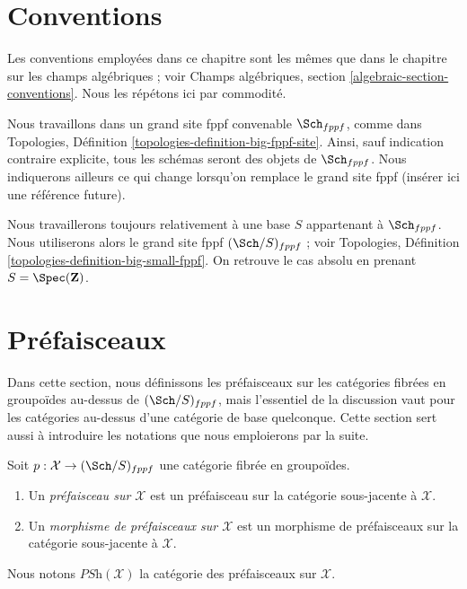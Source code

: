 \section{Conventions}
\label{section-conventions}

\noindent
Les conventions employées dans ce chapitre sont les mêmes que dans le
chapitre sur les champs algébriques ; voir
Champs algébriques, section \ref{algebraic-section-conventions}.
Nous les répétons ici par commodité.

\medskip\noindent
Nous travaillons dans un grand site fppf convenable $\Sch_{fppf}$, comme dans
Topologies, Définition \ref{topologies-definition-big-fppf-site}.
Ainsi, sauf indication contraire explicite, tous les schémas seront des objets
de $\Sch_{fppf}$. Nous indiquerons ailleurs ce qui change lorsqu'on remplace le
grand site fppf (insérer ici une référence future).

\medskip\noindent
Nous travaillerons toujours relativement à une base $S$ appartenant à $\Sch_{fppf}$.
Nous utiliserons alors le grand site fppf $(\Sch/S)_{fppf}$ ; voir
Topologies, Définition \ref{topologies-definition-big-small-fppf}.
On retrouve le cas absolu en prenant
$S = \Spec(\mathbf{Z})$.





\section{Préfaisceaux}
\label{section-presheaves}

\noindent
Dans cette section, nous définissons les préfaisceaux sur les catégories fibrées en
groupoïdes au-dessus de $(\Sch/S)_{fppf}$, mais l'essentiel de la discussion vaut
pour les catégories au-dessus d'une catégorie de base quelconque. Cette section sert aussi à
introduire les notations que nous emploierons par la suite.

\begin{definition}
\label{definition-presheaves}
Soit $p : \mathcal{X} \to (\Sch/S)_{fppf}$ une catégorie fibrée en
groupoïdes.
\begin{enumerate}
\item Un {\it préfaisceau sur $\mathcal{X}$} est un préfaisceau sur la
catégorie sous-jacente à $\mathcal{X}$.
\item Un {\it morphisme de préfaisceaux sur $\mathcal{X}$} est un morphisme de
préfaisceaux sur la catégorie sous-jacente à $\mathcal{X}$.
\end{enumerate}
Nous notons $\textit{PSh}(\mathcal{X})$ la catégorie des préfaisceaux sur
$\mathcal{X}$.
\end{definition}

